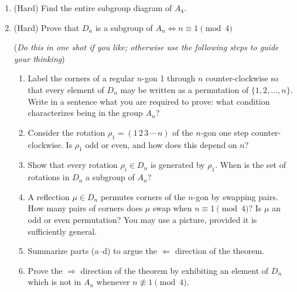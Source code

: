 \begin{exercises}
\begin{enumerate}
  	
 	\item\label{exs:a4subgroups} (Hard) Find the entire subgroup diagram of $A_4$.
 	
  
  \item (Hard) Prove that $D_n$ is a subgroup of $A_n\iff n\equiv 1\pmod 4$\par
	(\emph{Do this in one shot if you like; otherwise use the following steps to guide your thinking})
	\begin{enumerate}
   	\item Label the corners of a regular $n$-gon 1 through $n$ counter-clockwise so that every element of $D_n$ may be written as a permutation of $\{1,2,\ldots,n\}$. Write in a sentence what you are required to prove: what condition characterizes being in the group $A_n$?
   	
   	\item Consider the rotation $\rho_1=(1\,2\,3\,\cdots \,n)$ of the $n$-gon one step counter-clockwise. Is $\rho_1$ odd or even, and how does this depend on $n$?
   	
   	\item Show that every rotation $\rho_i\in D_n$ is generated by $\rho_1$. When is the set of rotations in $D_n$ a subgroup of $A_n$?
   	
   	\item A reflection $\mu\in D_n$ permutes corners of the $n$-gon by swapping pairs. How many pairs of corners does $\mu$ swap when $n\equiv 1\pmod 4$? Is $\mu$ an odd or even permutation? You may use a picture, provided it is sufficiently general.
   	
   	\item Summarize parts (a--d) to argue the $\Leftarrow$ direction of the theorem.
   	
   	\item Prove the $\Rightarrow$ direction of the theorem by exhibiting an element of $D_n$ which is not in $A_n$ whenever $n\not\equiv 1\pmod 4$.
\end{enumerate}



\end{enumerate}

\end{exercises}
